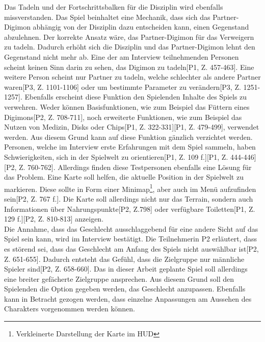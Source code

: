 Das Tadeln und der Fortschrittsbalken für die Disziplin wird ebenfalls missverstanden.
Das Spiel beinhaltet eine Mechanik, dass sich das Partner-Digimon abhängig von der Disziplin dazu entscheiden kann, einen Gegenstand abzulehnen.
Der korrekte Ansatz wäre, das Partner-Digimon für das Verweigern zu tadeln.
Dadurch erhöht sich die Disziplin und das Partner-Digimon lehnt den Gegenstand nicht mehr ab.
Eine der am Interview teilnehmenden Personen scheint keinen Sinn darin zu sehen, das Digimon zu tadeln[P1, Z. 457-463].
Eine weitere Person scheint nur Partner zu tadeln, welche schlechter als andere Partner waren[P3, Z. 1101-1106] oder um bestimmte Parameter zu verändern[P3, Z. 1251-1257].
Ebenfalls erscheint diese Funktion den Spielenden Inhalte des Spiels zu verwehren.
Weder können Basisfunktionen, wie zum Beispiel das Füttern eines Digimons[P2, Z. 708-711], noch erweiterte Funktionen, wie zum Beispiel das Nutzen von Medizin, Disks oder Chips[P1, Z. 322-331][P1, Z. 479-499], verwendet werden.
Aus diesem Grund kann auf diese Funktion gänzlich verzichtet werden\hypothesis.\\

Personen, welche im Interview erste Erfahrungen mit dem Spiel sammeln, haben Schwierigkeiten, sich in der Spielwelt zu orientieren[P1, Z. 109 f.][P1, Z. 444-446][P2, Z. 760-762].
Allerdings finden diese Testpersonen ebenfalls eine Lösung für das Problem.
Eine Karte soll helfen, die aktuelle Position in der Spielwelt zu markieren\hypothesis[P1, Z. 172-175][P1, Z. 521-524][P2, Z. 765].
Diese sollte in Form einer Minimap\footnote{Verkleinerte Darstellung der Karte im \ac{HUD}}, aber auch im Menü aufzufinden sein[P2, Z. 767 f.].
Die Karte soll allerdings nicht nur das Terrain, sondern auch Informationen über Nahrungspunkte[P2, Z.798] oder verfügbare Toiletten[P1, Z. 129 f.][P2, Z. 810-813] anzeigen\hypothesis.\\

Die Annahme, dass das Geschlecht ausschlaggebend für eine andere Sicht auf das Spiel sein kann, wird im Interview bestätigt.
Die Teilnehmerin P2 erläutert, dass es störend sei, dass das Geschlecht am Anfang des Spiels nicht auswählbar ist[P2, Z. 651-655].
Dadurch entsteht das Gefühl, dass die Zielgruppe nur männliche Spieler sind[P2, Z. 658-660].
Das in dieser Arbeit geplante Spiel soll allerdings eine breiter gefächerte Zielgruppe ansprechen.
Aus diesem Grund soll den Spielenden die Option gegeben werden, das Geschlecht anzupassen\hypothesis.
Ebenfalls kann in Betracht gezogen werden, dass einzelne Anpassungen am Aussehen des Charakters vorgenommen werden können\hypothesis[P2, Z. 665-668]. \\

